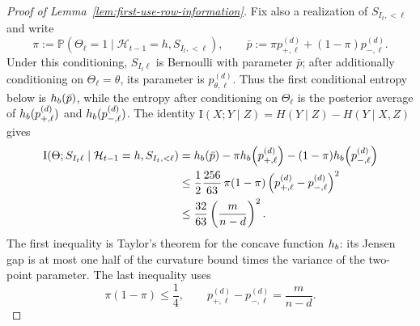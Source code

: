 \documentclass[10pt,a4paper]{amsart}
\newcommand{\Prob}{\mathbb{P}}
\begin{document}
\begin{proof}[Proof of Lemma~\ref{lem:first-use-row-information}]
Fix also a realization of $S_{I_t,<\ell}$ and write
\[
 \pi:=\Prob(\Theta_\ell=1\mid
   \mathcal H_{t-1}=h,S_{I_t,<\ell}),
 \qquad
 \bar p:=\pi p_{+,\ell}^{(d)}+(1-\pi)p_{-,\ell}^{(d)}.
\]
Under this conditioning, $S_{I_t\ell}$ is Bernoulli with parameter $\bar p$;
after additionally conditioning on $\Theta_\ell=\theta$, its parameter is
$p_{\theta,\ell}^{(d)}$.  Thus the first conditional entropy below is
$h_{\rm b}(\bar p)$, while the entropy after conditioning on $\Theta_\ell$ is
the posterior average of $h_{\rm b}(p_{+,\ell}^{(d)})$ and
$h_{\rm b}(p_{-,\ell}^{(d)})$.  The identity
$\mathrm I(X;Y\mid Z)=H(Y\mid Z)-H(Y\mid X,Z)$ gives
\begin{align}
 \mathrm I(
 \Theta;S_{I_t\ell}
 \mid \mathcal H_{t-1}=h,S_{I_t,<\ell})
 &=h_{\rm b}(\bar p)
   -\pi h_{\rm b}\!\left(p_{+,\ell}^{(d)}\right)
   -(1-\pi)h_{\rm b}\!\left(p_{-,\ell}^{(d)}\right)
   \notag\\
 &\le \frac12\frac{256}{63}\,
   \pi(1-\pi)
   \left(p_{+,\ell}^{(d)}-p_{-,\ell}^{(d)}\right)^2
   \notag\\
 &\le\frac{32}{63}
   \left(\frac{m}{n-d}\right)^2.
 \label{eq:one-coordinate-mutual-information}
\end{align}
The first inequality is Taylor's theorem for the concave function $h_{\rm b}$:
its Jensen gap is at most one half of the curvature bound times the variance of
the two-point parameter.  The last inequality uses
\[
 \pi(1-\pi)\le\frac14,
 \qquad
 p_{+,\ell}^{(d)}-p_{-,\ell}^{(d)}=\frac{m}{n-d}.
\]


\end{proof}
\end{document}
